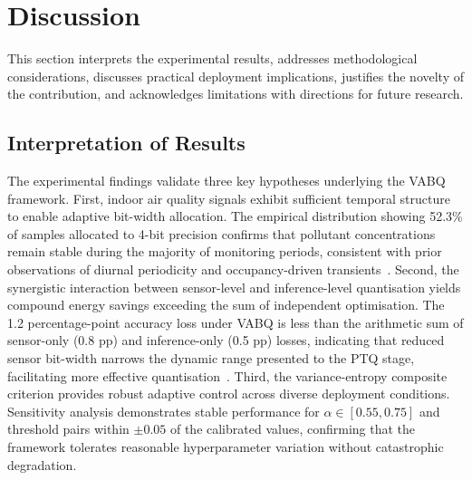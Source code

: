 \section{Discussion}
\label{sec:discussion}

This section interprets the experimental results, addresses methodological considerations, discusses practical deployment implications, justifies the novelty of the contribution, and acknowledges limitations with directions for future research.

\subsection{Interpretation of Results}
\label{sec:disc_interpretation}

The experimental findings validate three key hypotheses underlying the VABQ framework. First, indoor air quality signals exhibit sufficient temporal structure to enable adaptive bit-width allocation. The empirical distribution showing 52.3\% of samples allocated to 4-bit precision confirms that pollutant concentrations remain stable during the majority of monitoring periods, consistent with prior observations of diurnal periodicity and occupancy-driven transients~\cite{karmakar2024exploring}. Second, the synergistic interaction between sensor-level and inference-level quantisation yields compound energy savings exceeding the sum of independent optimisation. The 1.2 percentage-point accuracy loss under VABQ is less than the arithmetic sum of sensor-only (0.8 pp) and inference-only (0.5 pp) losses, indicating that reduced sensor bit-width narrows the dynamic range presented to the PTQ stage, facilitating more effective quantisation~\cite{nagel2021whitepaper}. Third, the variance-entropy composite criterion provides robust adaptive control across diverse deployment conditions. Sensitivity analysis demonstrates stable performance for $\alpha \in [0.55, 0.75]$ and threshold pairs within $\pm 0.05$ of the calibrated values, confirming that the framework tolerates reasonable hyperparameter variation without catastrophic degradation.

